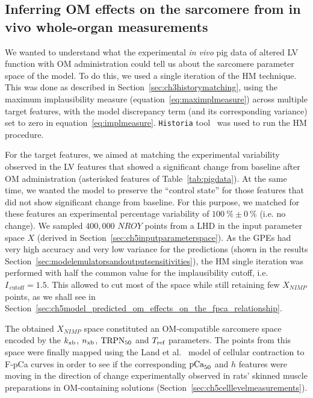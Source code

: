 %
%
%
\subsection{Inferring OM effects on the sarcomere from in vivo whole-organ measurements}\label{sec:ch5inferringomeffectsfpcawholeorgan}
We wanted to understand what the experimental \textit{in vivo} pig data of altered LV function with OM administration could tell us about the sarcomere parameter space of the model. To do this, we used a single iteration of the HM technique. This was done as described in Section~\ref{sec:ch3historymatching}, using the maximum implausibility measure
(equation~\eqref{eq:maximplmeasure}) across multiple target features, with the model discrepancy term (and its corresponding variance) set to zero in equation~\eqref{eq:implmeasure}. \texttt{Historia} tool~\cite{Historia:2021} was used to run the HM procedure.

\vspace{0.2cm}
For the target features, we aimed at matching the experimental variability observed in the LV features that showed a significant change from baseline after OM administration (asterisked features of Table~\ref{tab:pigdata}). At the same time, we wanted the model to preserve the ``control state'' for those features that did not show significant change from baseline. For this purpose, we matched for these features an experimental percentage variability of $\SI{100}{\percent}\pm\SI{0}{\percent}$ (i.e. no change). We sampled $400,000$ $NROY$ points from a LHD in the input parameter space $X$ (derived in Section~\ref{sec:ch5inputparameterspace}). As the GPEs had very high accuracy and very low variance for the predictions (shown in the results Section~\ref{sec:modelemulatorsandoutputsensitivities}), the HM single iteration was performed with half the common value for the implausibility cutoff, i.e. $I_{\,\textrm{cutoff}}=1.5$. This allowed to cut most of the space while still retaining few $X_{NIMP}$ points, as we shall see in Section~\ref{sec:ch5model_predicted_om_effects_on_the_fpca_relationship}.

\vspace{0.2cm}
The obtained $X_{NIMP}$ space constituted an OM-compatible sarcomere space encoded by the $k_{\textrm{xb}}$, $n_{\textrm{xb}}$, $\textrm{TRPN}_{50}$ and $T_{\textrm{ref}}$ parameters. The points from this space were finally mapped using the Land et al.~\cite{Land:2012} model of cellular contraction to F-pCa curves in order to see if the corresponding $\textrm{pCa}_{50}$ and $h$ features were moving in the direction of change experimentally observed in rats' skinned muscle preparations in OM-containing solutions (Section~\ref{sec:ch5celllevelmeasurements}).


